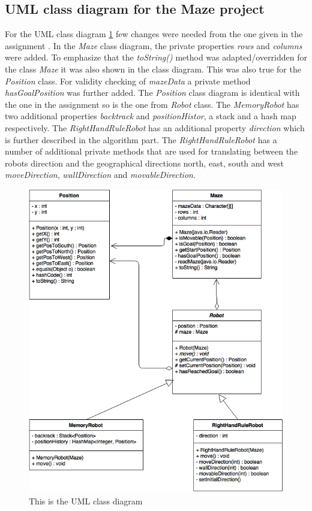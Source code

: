 \documentclass[a4paper,11pt,twoside]{article}
\begin{document}
\subsection{UML class diagram for the Maze project}
For the UML class diagram \ref{fig:UML} few changes were needed from
the one given in the assignment \cite{maze}. In the \textit{Maze}
class diagram, the private properties \textit{rows} and
\textit{columns} were added. To emphasize that the \textit{toString()}
method was adapted/overridden for the class \textit{Maze} it was also 
shown in the class diagram. This was also true for the
\textit{Position} class. For validity checking of \textit{mazeData} a
private method \textit{hasGoalPosition} was further added. The
\textit{Position} class diagram is identical with the one in the
assignment so is the one from \textit{Robot} class. The
\textit{MemoryRobot} has two additional properties \textit{backtrack}
and \textit{positionHistor}, a stack and a hash map respectively. The
\textit{RightHandRuleRobot} has an additional property
\textit{direction} which is further described in the algorithm part.
The \textit{RightHandRuleRobot} has a number of additional private
methods that are used for translating between the robots direction and
the geographical directions north, east, south and west
\textit{moveDirection}, \textit{wallDirection} and \textit{movableDirection}. 

\begin{figure}
\centering
\includegraphics[width=\textwidth]{maze.png}
\caption{This is the UML class diagram}
\label{fig:UML}
\end{figure}
\end{document}
